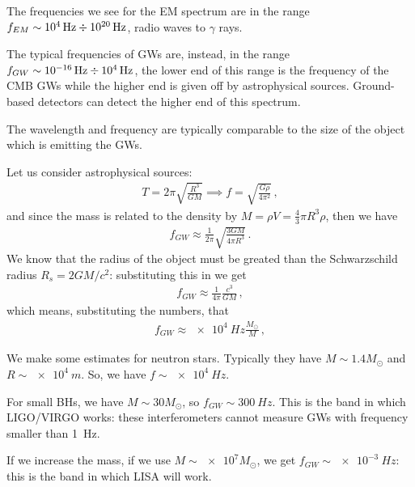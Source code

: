 \documentclass[main.tex]{subfiles}
\begin{document}
The frequencies we see for the EM spectrum are in the range \(f_{EM} \sim \SI{e4}{Hz} \divisionsymbol \SI{e20}{Hz}\), radio waves to \(\gamma \) rays.

The typical frequencies of GWs are, instead, in  the range \(f_{GW} \sim \SI{e-16}{Hz} \divisionsymbol \SI{e4}{Hz}\), the lower end of this range is the frequency of the CMB GWs while the higher end is given off by astrophysical sources. 
Ground-based detectors can detect the higher end of this spectrum. 


The wavelength and frequency are typically comparable to the size of the object which is emitting the GWs. 

Let us consider astrophysical sources:
%
\begin{align}
T = 2 \pi \sqrt{\frac{R^3}{GM}} \implies f = \sqrt{\frac{G \rho }{4 \pi^2}}
\,,
\end{align}
%
and since the mass is related to the density by \(M = \rho V= \frac{4}{3} \pi R^3 \rho \), then we have 
%
\begin{align}
f_{GW} \approx \frac{1}{2 \pi } \sqrt{\frac{3GM}{4 \pi R^3}}
\,.
\end{align}
%
We know that the radius of the object must be greated than the Schwarzschild radius \(R_s = 2 GM / c^2\): substituting this in we get 
%
\begin{align}
f_{GW} \approx \frac{1}{4 \pi } \frac{c^3}{GM}
\,,
\end{align}
%
which means, substituting the numbers, that 
%
\begin{align}
f_{GW} \approx \SI{e4}{Hz} \frac{M_{\odot}}{M}
\,,
\end{align}
%


We make some estimates for neutron stars. Typically they have \(M \sim 1.4 M_{\odot}\) and \(R \sim \SI{e4}{m}\). So, we have \(f \sim \SI{e4}{Hz}\).

For small BHs, we have \(M \sim 30 M_{\odot}\), so \(f_{GW} \sim \SI{300}{Hz}\). This is the band in which LIGO/VIRGO works: these interferometers cannot measure GWs with frequency smaller than \SI{1}{Hz}.

If we increase the mass, if we use \(M \sim \num{e7} M_{\odot}\), we get \(f_{GW} \sim \SI{e-3}{Hz}\): this is the band in which LISA will work.
\end{document}
